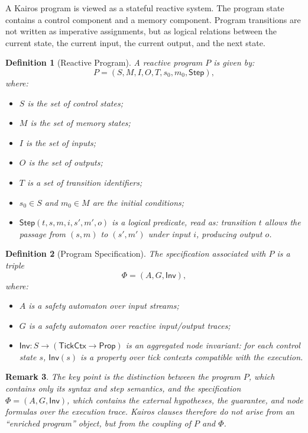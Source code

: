 \documentclass[11pt,a4paper]{article}
\newtheorem{definition}{Definition}[section]
\newtheorem{remark}[definition]{Remark}
\newcommand{\StepRel}{\mathsf{Step}}
\newcommand{\TickCtx}{\mathsf{TickCtx}}
\newcommand{\UserInv}{\mathsf{Inv}}
\begin{document}
A Kairos program is viewed as a stateful reactive system. The program state
contains a control component and a memory component. Program transitions are not
written as imperative assignments, but as logical relations between the current
state, the current input, the current output, and the next state.

\begin{definition}[Reactive Program]
A reactive program \(P\) is given by:
\[
P = (S,M,I,O,T,s_0,m_0,\StepRel),
\]
where:
\begin{itemize}[leftmargin=1.4em]
\item \(S\) is the set of control states;
\item \(M\) is the set of memory states;
\item \(I\) is the set of inputs;
\item \(O\) is the set of outputs;
\item \(T\) is a set of transition identifiers;
\item \(s_0 \in S\) and \(m_0 \in M\) are the initial conditions;
\item \(\StepRel(t,s,m,i,s',m',o)\) is a logical predicate, read as:
  transition \(t\) allows the passage from \((s,m)\) to \((s',m')\) under
  input \(i\), producing output \(o\).
\end{itemize}
\end{definition}

\begin{definition}[Program Specification]
The specification associated with \(P\) is a triple
\[
\Phi = (A,G,\UserInv),
\]
where:
\begin{itemize}[leftmargin=1.4em]
\item \(A\) is a safety automaton over input streams;
\item \(G\) is a safety automaton over reactive input/output traces;
\item \(\UserInv : S \to (\TickCtx \to \mathsf{Prop})\) is an aggregated node
  invariant: for each control state \(s\), \(\UserInv(s)\) is a property over
  tick contexts compatible with the execution.
\end{itemize}
\end{definition}

\begin{remark}
The key point is the distinction between the \emph{program} \(P\), which
contains only its syntax and step semantics, and the \emph{specification}
\(\Phi=(A,G,\UserInv)\), which contains the external hypotheses, the
guarantee, and node formulas over the execution trace. Kairos clauses
therefore do not arise from an ``enriched program'' object, but from the
coupling of \(P\) and \(\Phi\).
\end{remark}
\end{document}
